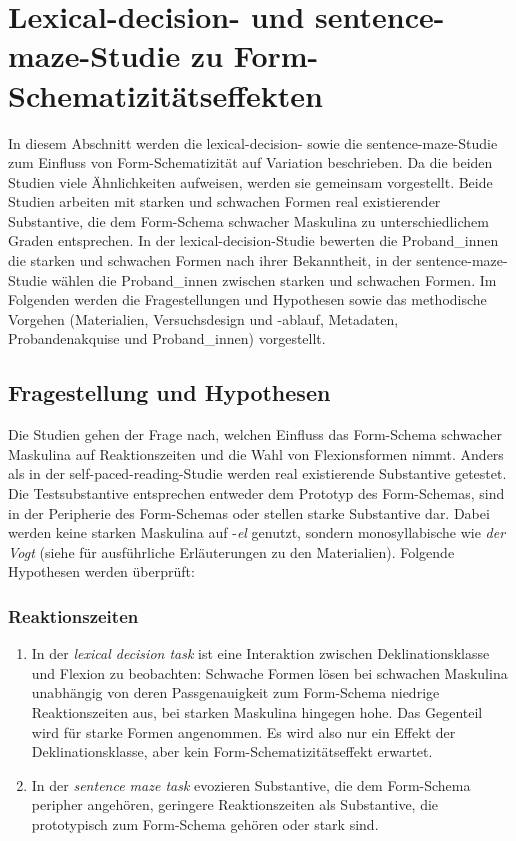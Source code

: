 \section[Lexical-decision- und sentence-maze-Studie zu Form-Schematizität]{Lexical-decision- und sentence-maze-Studie zu Form-Schematizitätseffekten}
\label{schemalex}

In diesem Abschnitt werden die lexical-decision- sowie die sentence-maze-Studie zum Einfluss von Form-Schematizität auf Variation beschrieben. Da die beiden Studien viele Ähnlichkeiten aufweisen, werden sie gemeinsam vorgestellt. Beide Studien arbeiten mit starken und schwachen Formen real existierender Substantive, die dem Form-Schema schwacher Maskulina zu unterschiedlichem Graden entsprechen. In der lexical-decision-Studie bewerten die Proband\_innen die starken und schwachen Formen nach ihrer Bekanntheit, in der sentence-maze-Studie wählen die Proband\_innen zwischen starken und schwachen Formen. Im Folgenden werden die Fragestellungen und Hypothesen sowie das methodische Vorgehen (Materialien, Versuchsdesign und -ablauf, Metadaten, Probandenakquise und Proband\_innen) vorgestellt.

\subsection{Fragestellung und Hypothesen}
\label{hyposchema}

Die Studien gehen der Frage nach, welchen Einfluss das Form-Schema schwacher Maskulina auf Reaktionszeiten und die Wahl von Flexionsformen nimmt. Anders als in der self-paced-reading-Studie werden real existierende Substantive getestet. Die Testsubstantive entsprechen entweder dem Prototyp des Form-Schemas, sind in der Peripherie des Form-Schemas oder stellen starke Substantive dar. Dabei werden keine starken Maskulina auf -\textit{el} genutzt, sondern monosyllabische wie \textit{der Vogt} (siehe  für ausführliche Erläuterungen zu den Materialien). Folgende Hypothesen werden überprüft:

\subsubsection{Reaktionszeiten}
\begin{enumerate}
  \item In der \textit{lexical decision task} ist eine Interaktion zwischen Deklinationsklasse und Flexion zu beobachten: Schwache Formen lösen bei schwachen Maskulina unabhängig von deren Passgenauigkeit zum Form-Schema niedrige Reaktionszeiten aus, bei starken Maskulina hingegen hohe. Das Gegenteil wird für starke Formen angenommen. Es wird also nur ein Effekt der Deklinationsklasse, aber kein Form-Schematizitätseffekt erwartet.

  \item In der \textit{sentence maze task} evozieren Substantive, die dem Form-Schema peripher angehören, geringere Reaktionszeiten  als Substantive, die prototypisch zum Form-Schema gehören oder stark sind.
\end{enumerate}

